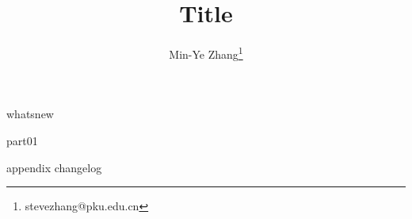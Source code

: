 \documentclass[a4paper,12pt]{report}
\begin{document}
\title{Title}
\author{Min-Ye Zhang\thanks{stevezhang@pku.edu.cn}}

{whatsnew}

\maketitle
\clearpage
\begingroup
\hypersetup{linkcolor=black}
\hypertarget{toc}{}%
\bookmark[dest=toc]{\contentsname}
\tableofcontents
\endgroup
\clearpage

{part01}
\begin{appendices}
{appendix}
{changelog}
\end{appendices}

\end{document}
